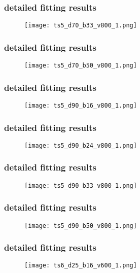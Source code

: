 	\begin{frame}
		\frametitle{\appendixname{} \textendash{} detailed fitting results}
		\begin{figure}
			\texttt{[image: ts5\_d70\_b33\_v800\_1.png]}
		\end{figure}
	\end{frame}

	\begin{frame}
		\frametitle{\appendixname{} \textendash{} detailed fitting results}
		\begin{figure}
			\texttt{[image: ts5\_d70\_b50\_v800\_1.png]}
		\end{figure}
	\end{frame}

	\begin{frame}
		\frametitle{\appendixname{} \textendash{} detailed fitting results}
		\begin{figure}
			\texttt{[image: ts5\_d90\_b16\_v800\_1.png]}
		\end{figure}
	\end{frame}

	\begin{frame}
		\frametitle{\appendixname{} \textendash{} detailed fitting results}
		\begin{figure}
			\texttt{[image: ts5\_d90\_b24\_v800\_1.png]}
		\end{figure}
	\end{frame}

	\begin{frame}
		\frametitle{\appendixname{} \textendash{} detailed fitting results}
		\begin{figure}
			\texttt{[image: ts5\_d90\_b33\_v800\_1.png]}
		\end{figure}
	\end{frame}

	\begin{frame}
		\frametitle{\appendixname{} \textendash{} detailed fitting results}
		\begin{figure}
			\texttt{[image: ts5\_d90\_b50\_v800\_1.png]}
		\end{figure}
	\end{frame}

	\begin{frame}
		\frametitle{\appendixname{} \textendash{} detailed fitting results}\label{app:details:ts6v600}
		\begin{figure}
			\texttt{[image: ts6\_d25\_b16\_v600\_1.png]}
		\end{figure}
	\end{frame}

